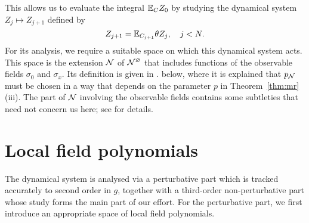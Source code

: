 This allows us to evaluate the integral $\mathbb{E}_C Z_0$ by studying the
dynamical system $Z_j \mapsto Z_{j+1}$ defined by
\begin{equation}
Z_{j+1} = \mathbb{E}_{C_{j+1}} \theta Z_j, \quad j < N.
\end{equation}
For its analysis, we require a suitable space on which this dynamical system acts.
This space is the extension $\mathcal{N}$ of $\mathcal{N}^\varnothing$ that includes functions
of the observable fields $\sigma_0$ and $\sigma_x$. Its definition is given
in \cite[Section~\ref{phi4-sec:phi4observables_representation}]{ST-phi4}.
below,
where it is explained that $p_{\mathcal{N}}$ must be chosen in a way that depends on the
parameter $p$ in Theorem~\ref{thm:mr}(iii).
The part of $\mathcal{N}$ involving the observable fields contains some subtleties that
need not concern us here; see \cite[Section~\ref{phi4-sec:phi4observables_representation}]{ST-phi4}
for details.


\section{Local field polynomials}

The dynamical system is analysed via a perturbative part which is tracked accurately
to second order in $g$, together with a third-order non-perturbative part whose study
forms the main part of our effort.  For the perturbative part, we first introduce
an appropriate space of local field polynomials.

